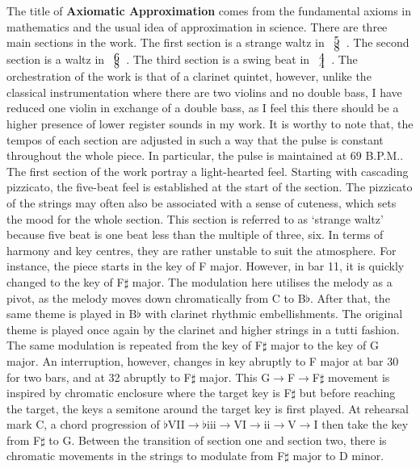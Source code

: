 \documentclass{article}
\begin{document}
The title of \textbf{Axiomatic Approximation} comes from the fundamental axioms
in mathematics and the usual idea of approximation in science. There are three
main sections in the work. The first section is a strange waltz in
\(\def\arraystretch{0.0}\begin{array}{c}5\\8\end{array}\). The second section
    is a waltz in \(\def\arraystretch{0.0}\begin{array}{c}6\\8\end{array}\).
        The third section is a swing beat in
\(\def\arraystretch{0.0}\begin{array}{c}4\\4\end{array}\).  The orchestration
    of the work is that of a clarinet quintet, however, unlike the classical
instrumentation where there are two violins and no double bass, I have reduced
one violin in exchange of a double bass, as I feel this there should be a
higher presence of lower register sounds in my work. It is worthy to note that,
the tempos of each section are adjusted in such a way that the pulse is
constant throughout the whole piece. In particular, the pulse is maintained at
69 B.P.M..\\

The first section of the work portray a light-hearted feel. Starting with
cascading pizzicato, the five-beat feel is established at the start of the
section. The pizzicato of the strings may often also be associated with a sense
of cuteness, which sets the mood for the whole section. This section is
referred to as `strange waltz' because five beat is one beat less than the
multiple of three, six. In terms of harmony and key centres, they are rather
unstable to suit the atmosphere. For instance, the piece starts in the key of F
major. However, in bar 11, it is quickly changed to the key of F\(\sharp\)
major. The modulation here utilises the melody as a pivot, as the melody moves
down chromatically from C to B\(\flat\). After that, the same theme is played
in B\(\flat\) with clarinet rhythmic embellishments. The original theme is
played once again by the clarinet and higher strings in a tutti fashion. The
same modulation is repeated from the key of F\(\sharp\) major to the key of G
major. An interruption, however, changes in key abruptly to F major at bar 30
for two bars, and at 32 abruptly to F\(\sharp\) major. This
G\(\to\)F\(\to\)F\(\sharp\) movement is inspired by chromatic enclosure where
the target key is F\(\sharp\) but before reaching the target, the keys a
semitone around the target key is first played. At rehearsal mark C, a chord
progression of
\(\flat\)VII\(\to\)\(\flat\)iii\(\to\)VI\(\to\)ii\(\to\)V\(\to\)I then take the
key from F\(\sharp\) to G. Between the transition of section one and section
two, there is chromatic movements in the strings to modulate from F\(\sharp\)
major to D minor.\\
\end{document}
